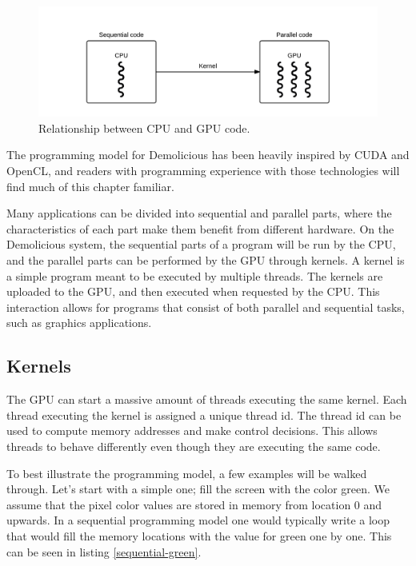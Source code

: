 \documentclass[../main/report.tex]{subfiles}
\begin{document}
\begin{figure}[H]
	\centering
	\includegraphics[width=\textwidth]{../system_overview/diagrams/programming_model_cpu_gpu.png}
	\caption{Relationship between CPU and GPU code.}
	\label{fig:programming_model_cpu_gpu}
\end{figure}

The programming model for Demolicious has been heavily inspired by CUDA and OpenCL, 
and readers with programming experience with those technologies will find much of this chapter familiar.

Many applications can be divided into sequential and parallel parts,
where the characteristics of each part make them benefit from different hardware.
On the Demolicious system, the sequential parts of a program will be run by the CPU, and the parallel parts can be performed by the GPU through kernels.
A kernel is a simple program meant to be executed by multiple threads.
The kernels are uploaded to the GPU, and then executed when requested by the CPU.
This interaction allows for programs that consist of both parallel and sequential tasks, such as graphics applications.

\subsection{Kernels}
The GPU can start a massive amount of threads executing the same kernel.
Each thread executing the kernel is assigned a unique thread id.
The thread id can be used to compute memory addresses and make control decisions.
This allows threads to behave differently even though they are executing the same code.

To best illustrate the programming model, a few examples will be walked through.
Let's start with a simple one; fill the screen with the color green.
We assume that the pixel color values are stored in memory from location 0 and upwards.
In a sequential programming model one would typically write a loop that would fill
the memory locations with the value for green one by one.
This can be seen in listing \ref{sequential-green}.
\end{document}
